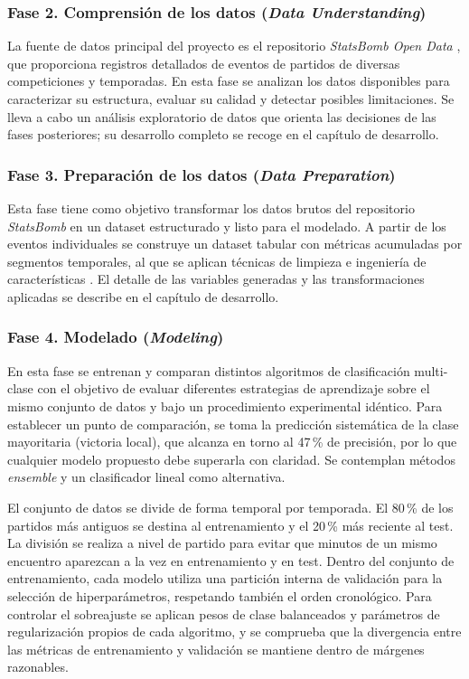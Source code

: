 \subsubsection{Fase 2. Comprensión de los datos (\textit{Data Understanding})}
La fuente de datos principal del proyecto es el repositorio \textit{StatsBomb Open Data} \citep{statsbomb2024opendata}, que proporciona registros detallados de eventos de partidos de diversas competiciones y temporadas. En esta fase se analizan los datos disponibles para caracterizar su estructura, evaluar su calidad y detectar posibles limitaciones. Se lleva a cabo un análisis exploratorio de datos que orienta las decisiones de las fases posteriores; su desarrollo completo se recoge en el capítulo de desarrollo.

\subsubsection{Fase 3. Preparación de los datos (\textit{Data Preparation})}
Esta fase tiene como objetivo transformar los datos brutos del repositorio \textit{StatsBomb} en un dataset estructurado y listo para el modelado. A partir de los eventos individuales se construye un dataset tabular con métricas acumuladas por segmentos temporales, al que se aplican técnicas de limpieza e ingeniería de características \citep{kuhn2019feature}. El detalle de las variables generadas y las transformaciones aplicadas se describe en el capítulo de desarrollo.

\subsubsection{Fase 4. Modelado (\textit{Modeling})}
En esta fase se entrenan y comparan distintos algoritmos de clasificación multi-clase con el objetivo de evaluar diferentes estrategias de aprendizaje sobre el mismo conjunto de datos y bajo un procedimiento experimental idéntico. Para establecer un punto de comparación, se toma la predicción sistemática de la clase mayoritaria (victoria local), que alcanza en torno al 47\,\% de precisión, por lo que cualquier modelo propuesto debe superarla con claridad. Se contemplan métodos \textit{ensemble} y un clasificador lineal como alternativa.

El conjunto de datos se divide de forma temporal por temporada. El 80\,\% de los partidos más antiguos se destina al entrenamiento y el 20\,\% más reciente al test. La división se realiza a nivel de partido para evitar que minutos de un mismo encuentro aparezcan a la vez en entrenamiento y en test. Dentro del conjunto de entrenamiento, cada modelo utiliza una partición interna de validación para la selección de hiperparámetros, respetando también el orden cronológico. Para controlar el sobreajuste se aplican pesos de clase balanceados y parámetros de regularización propios de cada algoritmo, y se comprueba que la divergencia entre las métricas de entrenamiento y validación se mantiene dentro de márgenes razonables.

